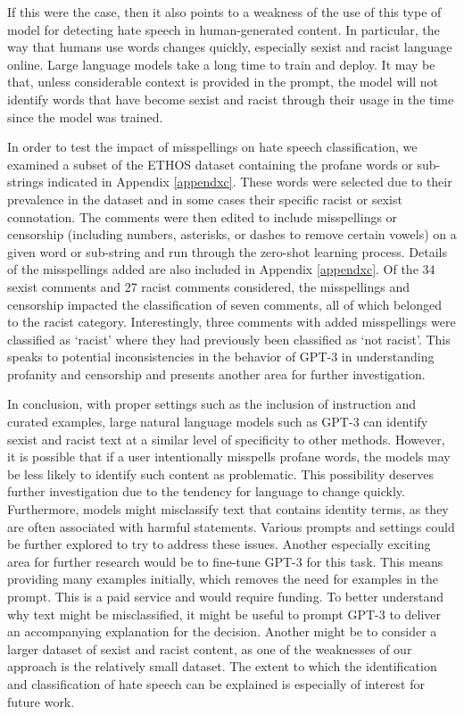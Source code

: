 \documentclass[12pt,]{article}
\begin{document}
If this were the case, then it also points to a weakness of the use of this type of model for detecting hate speech in human-generated content. In particular, the way that humans use words changes quickly, especially sexist and racist language online. Large language models take a long time to train and deploy. It may be that, unless considerable context is provided in the prompt, the model will not identify words that have become sexist and racist through their usage in the time since the model was trained.

In order to test the impact of misspellings on hate speech classification, we examined a subset of the ETHOS dataset containing the profane words or sub-strings indicated in Appendix \ref{appendxc}. These words were selected due to their prevalence in the dataset and in some cases their specific racist or sexist connotation. The comments were then edited to include misspellings or censorship (including numbers, asterisks, or dashes to remove certain vowels) on a given word or sub-string and run through the zero-shot learning process. Details of the misspellings added are also included in Appendix \ref{appendxc}. Of the 34 sexist comments and 27 racist comments considered, the misspellings and censorship impacted the classification of seven comments, all of which belonged to the racist category. Interestingly, three comments with added misspellings were classified as `racist' where they had previously been classified as `not racist'. This speaks to potential inconsistencies in the behavior of GPT-3 in understanding profanity and censorship and presents another area for further investigation.

In conclusion, with proper settings such as the inclusion of instruction and curated examples, large natural language models such as GPT-3 can identify sexist and racist text at a similar level of specificity to other methods. However, it is possible that if a user intentionally misspells profane words, the models may be less likely to identify such content as problematic. This possibility deserves further investigation due to the tendency for language to change quickly. Furthermore, models might misclassify text that contains identity terms, as they are often associated with harmful statements. Various prompts and settings could be further explored to try to address these issues. Another especially exciting area for further research would be to fine-tune GPT-3 for this task. This means providing many examples initially, which removes the need for examples in the prompt. This is a paid service and would require funding. To better understand why text might be misclassified, it might be useful to prompt GPT-3 to deliver an accompanying explanation for the decision. Another might be to consider a larger dataset of sexist and racist content, as one of the weaknesses of our approach is the relatively small dataset. The extent to which the identification and classification of hate speech can be explained is especially of interest for future work.
\end{document}

